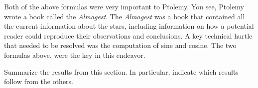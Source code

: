 \documentclass{ximera}
\begin{document}
Both of the above formulas were very important to Ptolemy. You see,
Ptolemy wrote a book called the \textit{Almagest}. The
\textit{Almagest} was a book that contained all the current
information about the stars, including information on how a potential
reader could reproduce their observations and conclusions. A key
technical hurtle that needed to be resolved was the computation of
sine and cosine. The two formulas above, were the key in this endeavor.












\begin{problem}
Summarize the results from this section. In particular, indicate which
results follow from the others.
\begin{freeResponse}
\end{freeResponse}
\end{problem}
\end{document}
